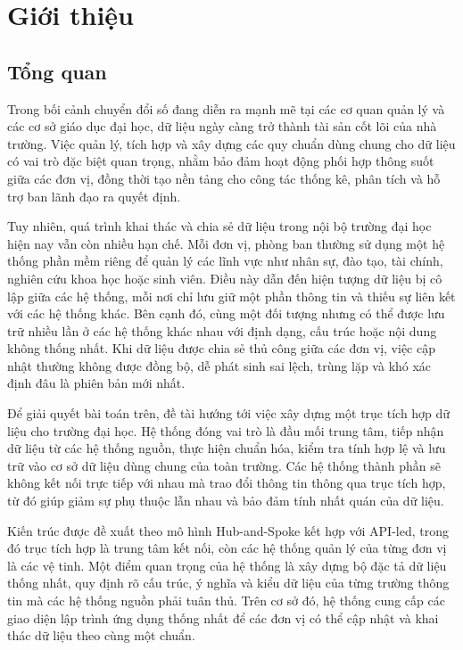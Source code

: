 \section{Giới thiệu}
\subsection{Tổng quan}

Trong bối cảnh chuyển đổi số đang diễn ra mạnh mẽ tại các cơ quan quản lý và các cơ sở giáo dục đại học, dữ liệu ngày càng trở thành tài sản cốt lõi của nhà trường. Việc quản lý, tích hợp và xây dựng các quy chuẩn dùng chung cho dữ liệu có vai trò đặc biệt quan trọng, nhằm bảo đảm hoạt động phối hợp thông suốt giữa các đơn vị, đồng thời tạo nền tảng cho công tác thống kê, phân tích và hỗ trợ ban lãnh đạo ra quyết định.

Tuy nhiên, quá trình khai thác và chia sẻ dữ liệu trong nội bộ trường đại học hiện nay vẫn còn nhiều hạn chế. Mỗi đơn vị, phòng ban thường sử dụng một hệ thống phần mềm riêng để quản lý các lĩnh vực như nhân sự, đào tạo, tài chính, nghiên cứu khoa học hoặc sinh viên. Điều này dẫn đến hiện tượng dữ liệu bị cô lập giữa các hệ thống, mỗi nơi chỉ lưu giữ một phần thông tin và thiếu sự liên kết với các hệ thống khác. Bên cạnh đó, cùng một đối tượng nhưng có thể được lưu trữ nhiều lần ở các hệ thống khác nhau với định dạng, cấu trúc hoặc nội dung không thống nhất. Khi dữ liệu được chia sẻ thủ công giữa các đơn vị, việc cập nhật thường không được đồng bộ, dễ phát sinh sai lệch, trùng lặp và khó xác định đâu là phiên bản mới nhất.

Để giải quyết bài toán trên, đề tài hướng tới việc xây dựng một trục tích hợp dữ liệu cho trường đại học. Hệ thống đóng vai trò là đầu mối trung tâm, tiếp nhận dữ liệu từ các hệ thống nguồn, thực hiện chuẩn hóa, kiểm tra tính hợp lệ và lưu trữ vào cơ sở dữ liệu dùng chung của toàn trường. Các hệ thống thành phần sẽ không kết nối trực tiếp với nhau mà trao đổi thông tin thông qua trục tích hợp, từ đó giúp giảm sự phụ thuộc lẫn nhau và bảo đảm tính nhất quán của dữ liệu.

Kiến trúc được đề xuất theo mô hình Hub-and-Spoke kết hợp với API-led, trong đó trục tích hợp là trung tâm kết nối, còn các hệ thống quản lý của từng đơn vị là các vệ tinh. Một điểm quan trọng của hệ thống là xây dựng bộ đặc tả dữ liệu thống nhất, quy định rõ cấu trúc, ý nghĩa và kiểu dữ liệu của từng trường thông tin mà các hệ thống nguồn phải tuân thủ. Trên cơ sở đó, hệ thống cung cấp các giao diện lập trình ứng dụng thống nhất để các đơn vị có thể cập nhật và khai thác dữ liệu theo cùng một chuẩn.

